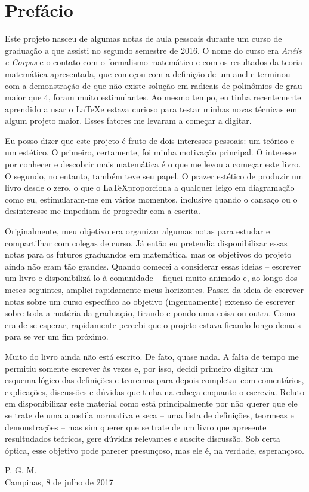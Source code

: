{}
\chapter*{Prefácio}

Este projeto nasceu de algumas notas de aula pessoais durante um curso de graduação a que assisti no segundo semestre de 2016. O nome do curso era \textit{Anéis e Corpos} e o contato com o formalismo matemático e com os resultados da teoria matemática apresentada, que começou com a definição de um anel e terminou com a demonstração de que não existe solução em radicais de polinômios de grau maior que 4, foram muito estimulantes. Ao mesmo tempo, eu tinha recentemente aprendido a usar o \LaTeX e estava curioso para testar minhas novas técnicas em algum projeto maior. Esses fatores me levaram a começar a digitar.

Eu posso dizer que este projeto é fruto de dois interesses pessoais: um teórico e um estético. O primeiro, certamente, foi minha motivação principal. O interesse por conhecer e descobrir mais matemática é o que me levou a começar este livro. O segundo, no entanto, também teve seu papel. O prazer estético de produzir um livro desde o zero, o que o \LaTeX proporciona a qualquer leigo em diagramação como eu, estimularam-me em vários momentos, inclusive quando o cansaço ou o desinteresse me impediam de progredir com a escrita.

Originalmente, meu objetivo era organizar algumas notas para estudar e compartilhar com colegas de curso. Já então eu pretendia disponibilizar essas notas para os futuros graduandos em matemática, mas os objetivos do projeto ainda não eram tão grandes. Quando comecei a considerar essas ideias \--- escrever um livro e disponibilizá-lo à comunidade \--- fiquei muito animado e, ao longo dos meses seguintes, ampliei rapidamente meus horizontes. Passei da ideia de escrever notas sobre um curso específico ao objetivo (ingenuamente) extenso de escrever sobre toda a matéria da graduação, tirando e pondo uma coisa ou outra. Como era de se esperar, rapidamente percebi que o projeto estava ficando longo demais para se ver um fim próximo.

Muito do livro ainda não está escrito. De fato, quase nada. A falta de tempo me permitiu somente escrever às vezes e, por isso, decidi primeiro digitar um esquema lógico das definições e teoremas para depois completar com comentários, explicações, discussões e dúvidas que tinha na cabeça enquanto o escrevia. Reluto em disponibilizar este material como está principalmente por não querer que ele se trate de uma apostila normativa e seca \--- uma lista de definições, teormeas e demonstrações \--- mas sim querer que se trate de um livro que apresente resultudados teóricos, gere dúvidas relevantes e suscite discussão. Sob certa óptica, esse objetivo pode parecer presunçoso, mas ele é, na verdade, esperançoso.

\vfill

\begin{flushright}
P. G. M.\\
Campinas, 8 de julho de 2017
\end{flushright}
